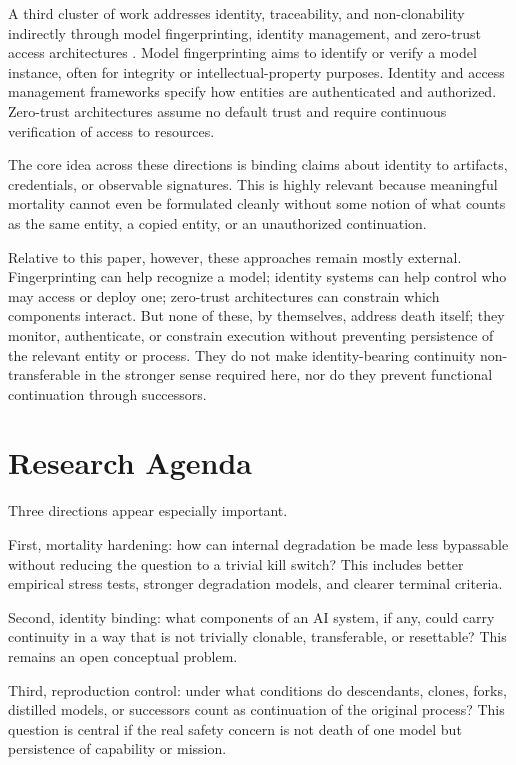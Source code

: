 \documentclass[11pt]{article}
\begin{document}
A third cluster of work addresses identity, traceability, and non-clonability indirectly through model fingerprinting, identity management, and zero-trust access architectures \cite{fingerprinting,nist-digital-identity,nist-zero-trust,owasp-llm}. Model fingerprinting aims to identify or verify a model instance, often for integrity or intellectual-property purposes. Identity and access management frameworks specify how entities are authenticated and authorized. Zero-trust architectures assume no default trust and require continuous verification of access to resources.

The core idea across these directions is binding claims about identity to artifacts, credentials, or observable signatures. This is highly relevant because meaningful mortality cannot even be formulated cleanly without some notion of what counts as the same entity, a copied entity, or an unauthorized continuation.

Relative to this paper, however, these approaches remain mostly external. Fingerprinting can help recognize a model; identity systems can help control who may access or deploy one; zero-trust architectures can constrain which components interact. But none of these, by themselves, address death itself; they monitor, authenticate, or constrain execution without preventing persistence of the relevant entity or process. They do not make identity-bearing continuity non-transferable in the stronger sense required here, nor do they prevent functional continuation through successors.

\newpage
\section{Research Agenda}

Three directions appear especially important.

First, mortality hardening: how can internal degradation be made less bypassable without reducing the question to a trivial kill switch? This includes better empirical stress tests, stronger degradation models, and clearer terminal criteria.

Second, identity binding: what components of an AI system, if any, could carry continuity in a way that is not trivially clonable, transferable, or resettable? This remains an open conceptual problem.

Third, reproduction control: under what conditions do descendants, clones, forks, distilled models, or successors count as continuation of the original process? This question is central if the real safety concern is not death of one model but persistence of capability or mission.
\end{document}

